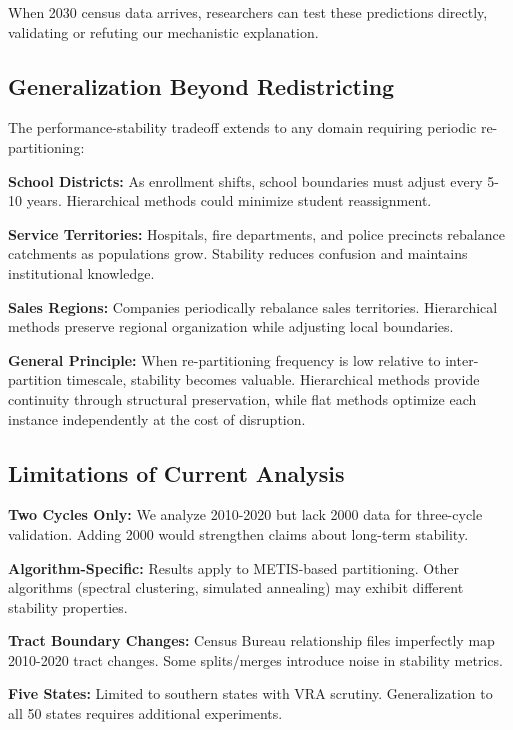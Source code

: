 When 2030 census data arrives, researchers can test these predictions directly, validating or refuting our mechanistic explanation.

\subsection{Generalization Beyond Redistricting}

The performance-stability tradeoff extends to any domain requiring periodic re-partitioning:

\textbf{School Districts:} As enrollment shifts, school boundaries must adjust every 5-10 years. Hierarchical methods could minimize student reassignment.

\textbf{Service Territories:} Hospitals, fire departments, and police precincts rebalance catchments as populations grow. Stability reduces confusion and maintains institutional knowledge.

\textbf{Sales Regions:} Companies periodically rebalance sales territories. Hierarchical methods preserve regional organization while adjusting local boundaries.

\textbf{General Principle:} When re-partitioning frequency is low relative to inter-partition timescale, stability becomes valuable. Hierarchical methods provide continuity through structural preservation, while flat methods optimize each instance independently at the cost of disruption.

\subsection{Limitations of Current Analysis}

\textbf{Two Cycles Only:} We analyze 2010-2020 but lack 2000 data for three-cycle validation. Adding 2000 would strengthen claims about long-term stability.

\textbf{Algorithm-Specific:} Results apply to METIS-based partitioning. Other algorithms (spectral clustering, simulated annealing) may exhibit different stability properties.

\textbf{Tract Boundary Changes:} Census Bureau relationship files imperfectly map 2010-2020 tract changes. Some splits/merges introduce noise in stability metrics.

\textbf{Five States:} Limited to southern states with VRA scrutiny. Generalization to all 50 states requires additional experiments.
